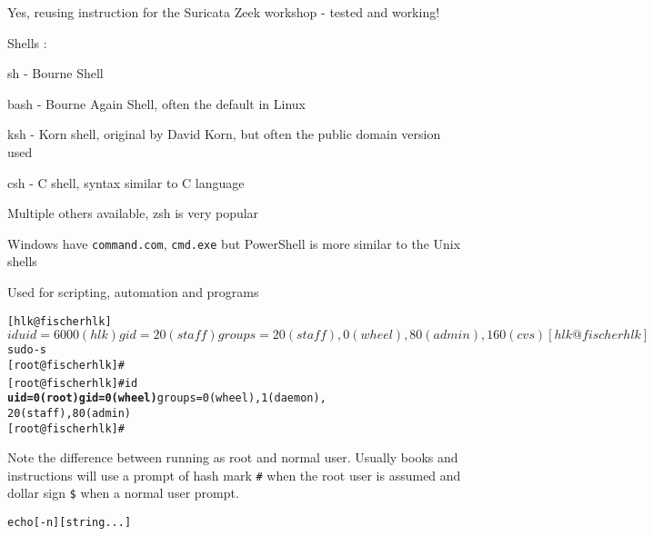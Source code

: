 \documentclass[Screen16to9,17pt]{foils}
\begin{document}
Yes, reusing instruction for the Suricata Zeek workshop - tested and working!



\begin{list1}
\item Shells :
  \begin{list2}
    \item sh - Bourne Shell
\item bash - Bourne Again Shell, often the default in Linux
\item ksh - Korn shell, original by David Korn, but often the public domain version used
\item csh - C shell, syntax similar to C language
\item Multiple others available, zsh is very popular
  \end{list2}
\item Windows have \verb+command.com+, \verb+cmd.exe+ but PowerShell is more similar to the Unix shells
\item Used for scripting, automation and programs
\end{list1}





\begin{alltt}
\small
[hlk@fischer hlk]$ id
uid=6000(hlk) gid=20(staff) groups=20(staff),
0(wheel), 80(admin), 160(cvs)
[hlk@fischer hlk]$ sudo -s
[root@fischer hlk]#
[root@fischer hlk]# id {\bf
uid=0(root) gid=0(wheel)} groups=0(wheel), 1(daemon),
20(staff), 80(admin)
[root@fischer hlk]#
\end{alltt}

Note the difference between running as root and normal user. Usually books and instructions will use a prompt of hash mark \verb+#+ when the root user is assumed and dollar sign \verb+$+ when a normal user prompt.



\begin{alltt}
echo [-n] [string ...]
\end{alltt}
\end{document}
